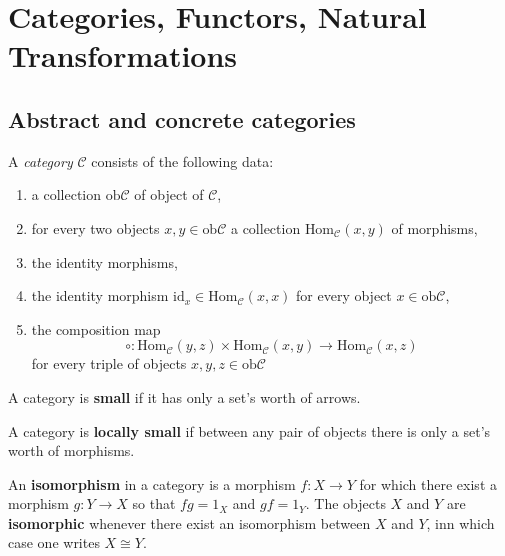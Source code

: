 \section{Categories, Functors, Natural Transformations} %
\label{sec:categories_functors_natural_transformations}

\subsection{Abstract and concrete categories} %
\label{sub:abstract_and_concrete_categories}

\begin{definition}
  A \textit{category} $ \mathcal{C} $ consists of the following data:
  \begin{enumerate}[label=(\roman*)]
    \item a collection $ \text{ob}\mathcal{C} $ of object of
      $ \mathcal{C} $,
    \item for every two objects $ x,y \in \text{ob}\mathcal{C} $ a collection $ \text{Hom}_{\mathcal{C}}(x,y) $ of morphisms,
    \item the identity morphisms,
    \item the identity morphism $ \text{id}_x \in \text{Hom}_{\mathcal{C}}(x,x) $ for every object $ x \in \text{ob}\mathcal{C} $,
    \item the composition map
      \[
        \circ: \text{Hom}_{\mathcal{C}}(y,z) \times \text{Hom}_{\mathcal{C}}(x,y) \to \text{Hom}_{\mathcal{C}}(x,z)
      \]
      for every triple of objects $ x,y,z \in \text{ob}\mathcal{C} $
  \end{enumerate}
\end{definition}

\begin{definition}
 A category is \textbf{small} if it has only a set's worth of arrows.
\end{definition}

\begin{definition}
 A category is \textbf{locally small} if between any pair of objects there is only a set's worth of morphisms.
\end{definition}

\begin{definition}
 An \textbf{isomorphism} in a category is a morphism $ f: X \to Y $ for which there exist a morphism $ g: Y \to X $ so that $ fg = 1_{X} $ and $ gf=1_{Y} $. The objects $ X $ and $ Y $ are \textbf{isomorphic} whenever there exist an isomorphism between $ X $ and $ Y $, inn which case one writes $ X \cong Y $.
\end{definition}

